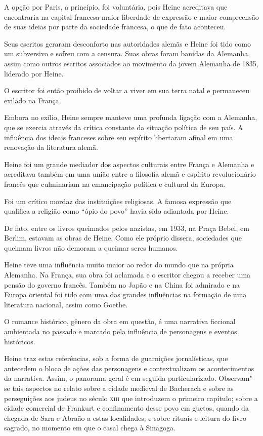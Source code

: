 \documentclass[12pt]{extarticle}
\begin{document}
A opção por Paris, a princípio, foi voluntária, pois Heine acreditava que encontraria na capital francesa maior liberdade de expressão e maior compreensão de suas ideias por parte da sociedade francesa, o que de fato aconteceu.

Seus escritos geraram desconforto nas autoridades alemãs e Heine foi tido como um subversivo e sofreu com a censura. Suas obras foram banidas da Alemanha, assim como outros escritos associados ao movimento da jovem Alemanha de 1835, liderado por Heine. 

O escritor foi então proibido de voltar a viver em sua terra natal e permaneceu exilado na França.

Embora no exílio, Heine sempre manteve uma profunda ligação com a Alemanha, que se exercia através da crítica constante da situação política de seu país. A influência dos ideais franceses sobre seu espírito libertaram afinal em uma renovação da literatura alemã.

Heine foi um grande mediador dos aspectos culturais entre França e Alemanha e acreditava também em uma união entre a filosofia alemã e espírito revolucionário francês que culminariam na emancipação política e cultural da Europa.

Foi um crítico mordaz das instituições religiosas. A famosa expressão que qualifica a religião como ``ópio do povo'' havia sido adiantada por Heine. 

De fato, entre os livros queimados pelos nazistas, em 1933, na Praça Bebel, em Berlim, estavam as obras de Heine. Como ele próprio dissera, sociedades que queimam livros não demoram a queimar seres humanos.

Heine teve uma influência muito maior ao redor do mundo que na própria Alemanha. Na França, sua obra foi aclamada e o escritor chegou a receber uma pensão do governo francês. Também no Japão e na China foi admirado e na Europa oriental foi tido com uma das grandes influências na formação de uma literatura nacional, assim como Goethe.

O romance histórico, gênero da obra em questão, é uma narrativa ficcional ambientada no passado e marcado pela influência de personagens e eventos históricos.


Heine traz estas referências, sob a forma de guarnições jornalísticas,
que antecedem o bloco de ações das personagens e contextualizam os
acontecimentos da narrativa. Assim, o panorama geral é em seguida
particularizado. Observam"-se tais aspectos no relato sobre a cidade
medieval de Bacherach e sobre as perseguições aos judeus no século \textsc{xiii}
que introduzem o primeiro capítulo; sobre a cidade comercial de Frankurt
e confinamento desse povo em guetos, quando da chegada de Sara e Abraão
a estas localidades; e sobre rituais e leitura do livro sagrado, no
momento em que o casal chega à Sinagoga.
\end{document}
